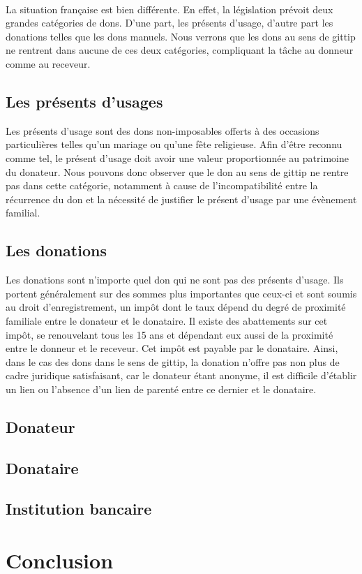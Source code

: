         \paragraph{}
            La situation française est bien différente. En effet, la
            législation prévoit deux grandes catégories de dons. D'une
            part, les présents d'usage, d'autre part les donations
            telles que les dons manuels. Nous verrons que les dons au sens
            de gittip ne rentrent dans aucune de ces deux catégories,
            compliquant la tâche au donneur comme au receveur.
        
        \subsection{Les présents d'usages}
            Les présents d'usage sont des dons non-imposables offerts à des
            occasions particulières telles qu'un mariage ou qu'une fête
            religieuse.
            Afin d'être reconnu comme tel, le présent d'usage doit avoir une 
            valeur proportionnée au patrimoine du donateur.
            Nous pouvons donc observer que le don au sens de gittip ne rentre
            pas dans cette catégorie, notamment à cause de l'incompatibilité
            entre la récurrence du don et la nécessité de justifier
            le présent d'usage par une évènement familial.

        \subsection{Les donations}
            Les donations sont n'importe quel don qui ne sont pas des présents
            d'usage. Ils portent généralement sur des sommes plus importantes
            que ceux-ci et sont soumis au droit d'enregistrement, un impôt
            dont le taux dépend du degré de proximité familiale entre le
            donateur et le donataire.
            Il existe des abattements sur cet impôt, se renouvelant tous
            les 15 ans et dépendant eux aussi de la proximité entre le
            donneur et le receveur. Cet impôt est payable par le donataire.
            Ainsi, dans le cas des dons dans le sens de gittip, la donation
            n'offre pas non plus de cadre juridique satisfaisant, car le 
            donateur étant anonyme, il est difficile d'établir un lien ou 
            l'absence d'un lien de parenté entre ce dernier et le donataire.
            
        \subsection{Donateur}
        \subsection{Donataire}
        \subsection{Institution bancaire}
    \section{Conclusion}

